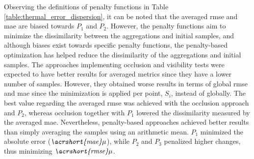 Observing the definitions of penalty functions in Table \ref{table:thermal_error_dispersion}, it can be noted that the averaged \acrshort{rmse} and \acrshort{mae} are biased towards $P_1$ and $P_2$. However, the penalty functions aim to minimize the dissimilarity between the aggregations and initial samples, and although biases exist towards specific penalty functions, the penalty-based optimization has helped reduce the dissimilarity of the aggregations and initial samples. The approaches implementing occlusion and visibility tests were expected to have better results for averaged metrics since they have a lower number of samples. However, they obtained worse results in terms of global \acrshort{rmse} and \acrshort{mae} since the minimization is applied per point, $S_i$, instead of globally. The best value regarding the averaged \acrshort{rmse} was achieved with the occlusion approach and $P_2$, whereas occlusion together with $P_1$ lowered the dissimilarity measured by the averaged \acrshort{mae}. Nevertheless, penalty-based approaches achieved better results than simply averaging the samples using an arithmetic mean. $P_1$ minimized the absolute error ($\textit{\acrshort{mae}}{\mu}$), while $P_2$ and $P_3$ penalized higher changes, thus minimizing $\textit{\acrshort{rmse}}{\mu}$.

